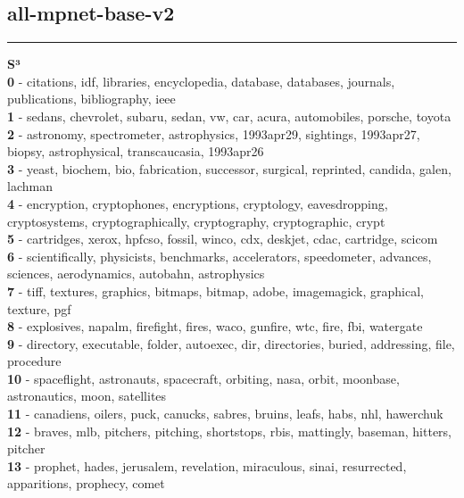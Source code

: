 \subsection{all-mpnet-base-v2}\vspace{2mm}
\hrule\vspace{2mm}
\noindent
\textbf{S³}\vspace{2mm}\\
\vspace{2mm}
\noindent
\textbf{0} - citations, idf, libraries, encyclopedia, database, databases, journals, publications, bibliography, ieee\\
\textbf{1} - sedans, chevrolet, subaru, sedan, vw, car, acura, automobiles, porsche, toyota\\
\textbf{2} - astronomy, spectrometer, astrophysics, 1993apr29, sightings, 1993apr27, biopsy, astrophysical, transcaucasia, 1993apr26\\
\textbf{3} - yeast, biochem, bio, fabrication, successor, surgical, reprinted, candida, galen, lachman\\
\textbf{4} - encryption, cryptophones, encryptions, cryptology, eavesdropping, cryptosystems, cryptographically, cryptography, cryptographic, crypt\\
\textbf{5} - cartridges, xerox, hpfcso, fossil, winco, cdx, deskjet, cdac, cartridge, scicom\\
\textbf{6} - scientifically, physicists, benchmarks, accelerators, speedometer, advances, sciences, aerodynamics, autobahn, astrophysics\\
\textbf{7} - tiff, textures, graphics, bitmaps, bitmap, adobe, imagemagick, graphical, texture, pgf\\
\textbf{8} - explosives, napalm, firefight, fires, waco, gunfire, wtc, fire, fbi, watergate\\
\textbf{9} - directory, executable, folder, autoexec, dir, directories, buried, addressing, file, procedure\\
\textbf{10} - spaceflight, astronauts, spacecraft, orbiting, nasa, orbit, moonbase, astronautics, moon, satellites\\
\textbf{11} - canadiens, oilers, puck, canucks, sabres, bruins, leafs, habs, nhl, hawerchuk\\
\textbf{12} - braves, mlb, pitchers, pitching, shortstops, rbis, mattingly, baseman, hitters, pitcher\\
\textbf{13} - prophet, hades, jerusalem, revelation, miraculous, sinai, resurrected, apparitions, prophecy, comet\\
